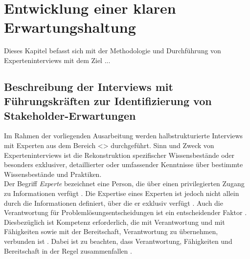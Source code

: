 \chapter{Entwicklung einer klaren Erwartungshaltung}
\label{chap:erwartungshaltung}
Dieses Kapitel befasst sich mit der Methodologie und Durchführung von Experteninterviews mit dem Ziel ...

\section{Beschreibung der Interviews mit Führungskräften zur Identifizierung von Stakeholder-Erwartungen}
\label{sec:beschreibung-der-interviews}

Im Rahmen der vorliegenden Ausarbeitung werden halbstrukturierte Interviews mit Experten aus dem Bereich <> durchgeführt. Sinn und Zweck von Experteninterviews ist die Rekonstruktion spezifischer Wissensbestände oder besonders exklusiver, detaillierter oder umfassender Kenntnisse über bestimmte Wissensbestände und Praktiken.\\

Der Begriff \emph{Experte} bezeichnet eine Person, die über einen privilegierten Zugang zu Informationen verfügt \cite{pfadenhauer2009eye}. Die Expertise eines Experten ist jedoch nicht allein durch die Informationen definiert, über die er exklusiv verfügt \cite{pfadenhauer2009eye}. Auch die Verantwortung für Problemlösungsentscheidungen ist ein entscheidender Faktor \cite{pfadenhauer2009eye}. Diesbezüglich ist Kompetenz erforderlich, die mit Verantwortung und mit Fähigkeiten sowie mit der Bereitschaft, Verantwortung zu übernehmen, verbunden ist \cite{pfadenhauer2009eye}. Dabei ist zu beachten, dass Verantwortung, Fähigkeiten und Bereitschaft in der Regel zusammenfallen \cite{pfadenhauer2009eye}.\\ 

